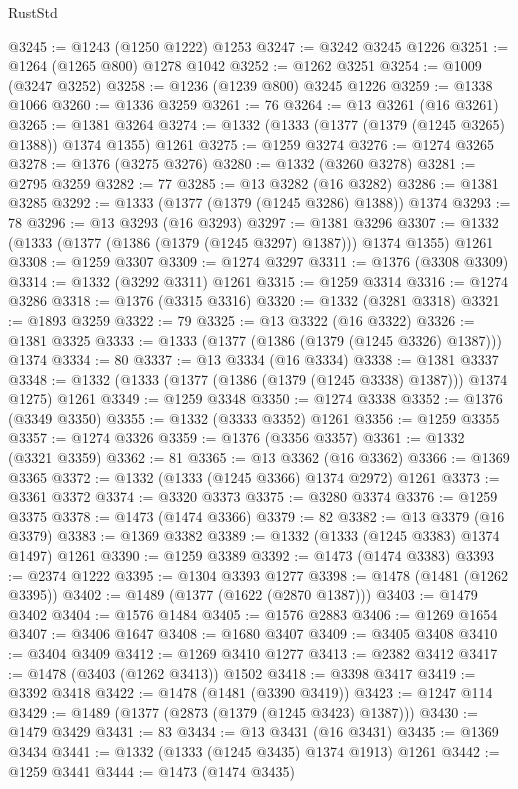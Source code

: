 \begin{lexlean}{RustStd}
\begin{coremodule}
@3245 := @1243 (@1250 @1222) @1253
@3247 := @3242 @3245 @1226
@3251 := @1264 (@1265 @800) @1278 @1042
@3252 := @1262 @3251
@3254 := @1009 (@3247 @3252)
@3258 := @1236 (@1239 @800) @3245 @1226
@3259 := @1338 @1066
@3260 := @1336 @3259
@3261 := 76
@3264 := @13 @3261 (@16 @3261)
@3265 := @1381 @3264
@3274 := @1332 (@1333 (@1377 (@1379 (@1245 @3265) @1388)) @1374 @1355) @1261
@3275 := @1259 @3274
@3276 := @1274 @3265
@3278 := @1376 (@3275 @3276)
@3280 := @1332 (@3260 @3278)
@3281 := @2795 @3259
@3282 := 77
@3285 := @13 @3282 (@16 @3282)
@3286 := @1381 @3285
@3292 := @1333 (@1377 (@1379 (@1245 @3286) @1388)) @1374
@3293 := 78
@3296 := @13 @3293 (@16 @3293)
@3297 := @1381 @3296
@3307 := @1332 (@1333 (@1377 (@1386 (@1379 (@1245 @3297) @1387))) @1374 @1355) @1261
@3308 := @1259 @3307
@3309 := @1274 @3297
@3311 := @1376 (@3308 @3309)
@3314 := @1332 (@3292 @3311) @1261
@3315 := @1259 @3314
@3316 := @1274 @3286
@3318 := @1376 (@3315 @3316)
@3320 := @1332 (@3281 @3318)
@3321 := @1893 @3259
@3322 := 79
@3325 := @13 @3322 (@16 @3322)
@3326 := @1381 @3325
@3333 := @1333 (@1377 (@1386 (@1379 (@1245 @3326) @1387))) @1374
@3334 := 80
@3337 := @13 @3334 (@16 @3334)
@3338 := @1381 @3337
@3348 := @1332 (@1333 (@1377 (@1386 (@1379 (@1245 @3338) @1387))) @1374 @1275) @1261
@3349 := @1259 @3348
@3350 := @1274 @3338
@3352 := @1376 (@3349 @3350)
@3355 := @1332 (@3333 @3352) @1261
@3356 := @1259 @3355
@3357 := @1274 @3326
@3359 := @1376 (@3356 @3357)
@3361 := @1332 (@3321 @3359)
@3362 := 81
@3365 := @13 @3362 (@16 @3362)
@3366 := @1369 @3365
@3372 := @1332 (@1333 (@1245 @3366) @1374 @2972) @1261
@3373 := @3361 @3372
@3374 := @3320 @3373
@3375 := @3280 @3374
@3376 := @1259 @3375
@3378 := @1473 (@1474 @3366)
@3379 := 82
@3382 := @13 @3379 (@16 @3379)
@3383 := @1369 @3382
@3389 := @1332 (@1333 (@1245 @3383) @1374 @1497) @1261
@3390 := @1259 @3389
@3392 := @1473 (@1474 @3383)
@3393 := @2374 @1222
@3395 := @1304 @3393 @1277
@3398 := @1478 (@1481 (@1262 @3395))
@3402 := @1489 (@1377 (@1622 (@2870 @1387)))
@3403 := @1479 @3402
@3404 := @1576 @1484
@3405 := @1576 @2883
@3406 := @1269 @1654
@3407 := @3406 @1647
@3408 := @1680 @3407
@3409 := @3405 @3408
@3410 := @3404 @3409
@3412 := @1269 @3410 @1277
@3413 := @2382 @3412
@3417 := @1478 (@3403 (@1262 @3413)) @1502
@3418 := @3398 @3417
@3419 := @3392 @3418
@3422 := @1478 (@1481 (@3390 @3419))
@3423 := @1247 @114
@3429 := @1489 (@1377 (@2873 (@1379 (@1245 @3423) @1387)))
@3430 := @1479 @3429
@3431 := 83
@3434 := @13 @3431 (@16 @3431)
@3435 := @1369 @3434
@3441 := @1332 (@1333 (@1245 @3435) @1374 @1913) @1261
@3442 := @1259 @3441
@3444 := @1473 (@1474 @3435)

\end{coremodule}
\end{lexlean}
